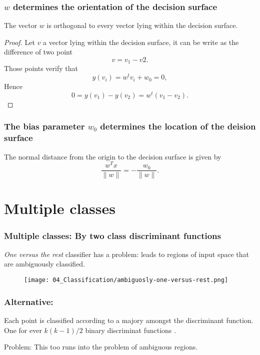 \begin{frame}
    \frametitle{$w$ determines the orientation of the decision surface}

    \begin{theorem}
        The vector $w$ is orthogonal to every vector lying within the decision surface. 
    \end{theorem}
    {\small
    \begin{proof}
        Let $v$ a vector lying within the decision surface, it can be write as the difference of two point 
        \begin{equation}
            v = v_1 - v2. 
        \end{equation}
        Those points verify that
        \begin{equation}
            y(v_i) = w ^t v_i + w_0 = 0, 
        \end{equation}
        Hence 
        \begin{equation}
            0 = y(v_1) - y(v_2) = w ^t (v_1 - v_2).
        \end{equation}
    \end{proof}
    }
\end{frame}

\begin{frame}
    \frametitle{The bias parameter $w_0$ determines the location of the deision surface}
    \begin{theorem}
        The normal distance from the origin to the decision surface is given by
        \begin{equation}
          \frac{w ^T x}{\|w\|} = - \frac{w_0}{\|w\|}.  
        \end{equation}
    \end{theorem}
    
\end{frame}

\section{Multiple classes}
\begin{frame}
    \frametitle{Multiple classes: By two class discriminant functions}

    \textit{One versus the rest} classifier has a problem: 
    leads to regions of input space that are ambiguously classified. 

    \begin{figure}[t]
        \texttt{[image: 04\_Classification/ambiguosly-one-versus-rest.png]}
        \centering
    \end{figure}
\end{frame}
\begin{frame}
    \frametitle{Alternative:  }
    Each  point is classified according to a majory amongst the discriminant function. 
One for ever $k (k-1) / 2$ binary discriminat functions . 

Problem: This too runs into the problem of ambiguous regions. 
\end{frame}

